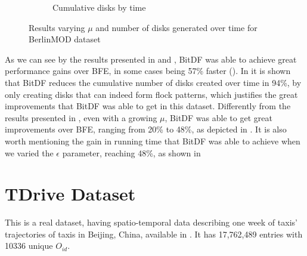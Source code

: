 {\begin{figure}[h!]
\begin{subfigure}[t]{0.48\textwidth}
        \caption{Cumulative disks by time}
        \label{fig:berlinmod_disks}
    \end{subfigure}
    \caption{Results varying $\mu$ and number of disks generated over time for BerlinMOD dataset}
    \label{fig:berlinmod_results2}
\end{figure}

As we can see by the results presented in  and , BitDF was
able to achieve great performance gains over BFE, in some cases being 57\% faster (). In
 it is shown that BitDF reduces the cumulative number of disks created over time in 94\%, by
only creating disks that can indeed form flock patterns, which justifies the great improvements that BitDF was able to
get in this dataset. Differently from the results presented in , even with a growing $\mu$, BitDF was
able to get great improvements over BFE, ranging from 20\% to 48\%, as depicted in . It is
also worth mentioning the gain in running time that BitDF was able to achieve when we varied the $\epsilon$ parameter,
reaching 48\%, as shown in 

\section{TDrive Dataset}
\label{sec:tdrive}
This is a real dataset, having spatio-temporal data describing one week of taxis' trajectories of taxis in Beijing,
China, available in \citep{tdrive}. It has 17,762,489 entries with 10336 unique $O_{id}$.

}
